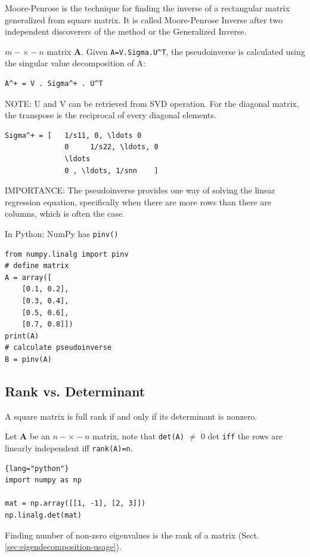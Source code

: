Moore-Penrose is the technique for finding the inverse of a rectangular matrix
generalized from square matrix. It is called Moore-Penrose Inverse after two
independent discoverers of the method or the Generalized Inverse.

$m-\times-n$ matrix $\mathbf{A}$. Given \verb!A=V.Sigma.U^T!, the pseudoinverse
is calculated using the singular value decomposition of A:

\begin{verbatim}
A^+ = V . Sigma^+ . U^T
\end{verbatim}

NOTE: U and V can be retrieved from SVD operation. 
For the diagonal matrix, the transpose is the reciprocal of every diagonal elements.
\begin{verbatim}
Sigma^+ = [   1/s11, 0, \ldots 0 
              0     1/s22, \ldots, 0
              \ldots
              0 , \ldots, 1/snn    ]
\end{verbatim}

IMPORTANCE:  The pseudoinverse provides one way of solving the linear regression
equation, specifically when there are more rows than there are columns, which is
often the case.

In Python: NumPy has \verb!pinv()!
\begin{lstlisting}
from numpy.linalg import pinv
# define matrix
A = array([
	[0.1, 0.2],
	[0.3, 0.4],
	[0.5, 0.6],
	[0.7, 0.8]])
print(A)
# calculate pseudoinverse
B = pinv(A)
\end{lstlisting}


\subsection{Rank vs. Determinant}
\label{sec:math-matrix-determinant}

A square matrix is full rank if and only if its determinant is nonzero.

Let $\mathbf{A}$ be an $n-\times-n$ matrix, note that \verb!det(A)! $\ne$ 0 det
\verb!iff! the rows are linearly independent iff \verb!rank(A)=n!.

\begin{lstlisting}{lang="python"}
import numpy as np

mat = np.array([[1, -1], [2, 3]])
np.linalg.det(mat)
\end{lstlisting}

Finding number of non-zero eigenvalues is the rank of a matrix (Sect.\ref{sec:eigendecomposition-usage}).

